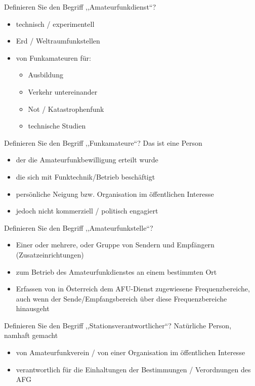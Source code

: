 \documentclass[avery5371,grid,frame,a4paper]{flashcards}
\newcommand{\card}[3]{
  \begin{flashcard}[{\chap} -- #1]{#2}#3\end{flashcard}
}
\begin{document}
\card{18}{Definieren Sie den Begriff ,,Amateurfunkdienst``?}{
  \begin{itemize}
    \item technisch / experimentell
    \item Erd / Weltraumfunkstellen
    \item von Funkamateuren für:
      \begin{itemize}
        \item Ausbildung
        \item Verkehr untereinander
        \item Not / Katastrophenfunk
        \item technische Studien
      \end{itemize}
  \end{itemize}
}

\card{19}{Definieren Sie den Begriff ,,Funkamateure``?}{
  Das ist eine Person
  \begin{itemize}
    \item der die Amateurfunkbewilligung erteilt wurde
    \item die sich mit Funktechnik/Betrieb beschäftigt
    \item persönliche Neigung bzw. Organisation im öffentlichen Interesse
    \item jedoch nicht kommerziell / politisch engagiert
  \end{itemize}
}

\card{20}{Definieren Sie den Begriff ,,Amateurfunkstelle``?}{
  \begin{itemize}
    \item Einer oder mehrere, oder Gruppe von Sendern und Empfängern (Zusatzeinrichtungen)
    \item zum Betrieb des Amateurfunkdienstes an einem bestimmten Ort
    \item Erfassen von in Österreich dem AFU-Dienst zugewiesene Frequenzbereiche, auch wenn der Sende/Empfangsbereich über diese Frequenzbereiche hinausgeht
  \end{itemize}
}

\card{21}{Definieren Sie den Begriff ,,Stationsverantwortlicher``?}{
  Natürliche Person, namhaft gemacht
  \begin{itemize}
    \item von Amateurfunkverein / von einer Organisation im öffentlichen Interesse
    \item verantwortlich für die Einhaltungen der Bestimmungen / Verordnungen des AFG
  \end{itemize}
}
\end{document}
